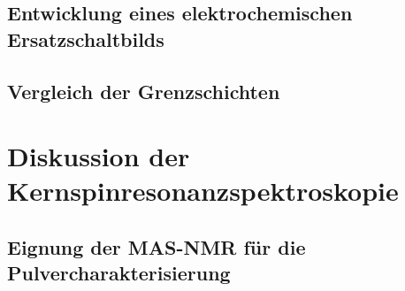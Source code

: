 \documentclass[a4paper, 11pt, headsepline,footsepline,twoside,abstract]{scrbook}
\begin{document}
\subsection{Entwicklung eines elektrochemischen Ersatzschaltbilds}
\subsection{Vergleich der Grenzschichten}
\section{Diskussion der Kernspinresonanzspektroskopie}
\subsection{Eignung der MAS-NMR für die Pulvercharakterisierung}
\end{document}
